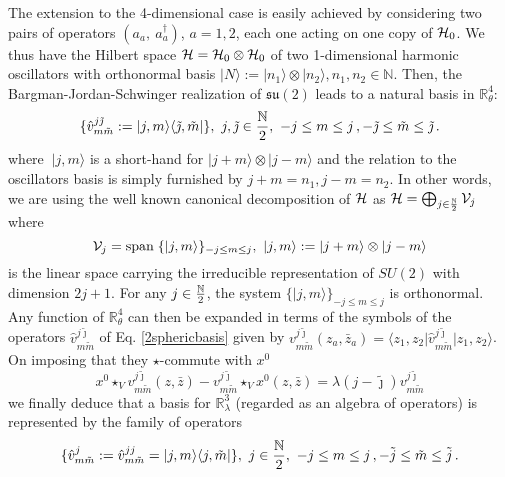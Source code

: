 \documentclass[a4paper,11pt]{article}
\numberwithin{equation}{section}
\newcommand\Rl{\mathbb{R}^3_\lambda}
\theoremstyle{nonumberplain}
\begin{document}
The extension to the 4-dimensional case is easily achieved by considering two pairs of operators $(a_a,\ a^\dag_a)$, $a=1,2$, each one acting on one copy of ${\cal{H}}_0$.  We thus have the Hilbert space  ${\cal{H}}={\cal{H}}_0\otimes {\cal{H}}_0$ of  two 1-dimensional harmonic oscillators with orthonormal basis $|N\rangle:= |n_1\rangle \otimes |n_2\rangle , n_1, n_2\in\mathbb{N}$.  Then, the Bargman-Jordan-Schwinger realization of $\mathfrak{su}(2)$ leads to a natural basis in  $\mathbb{R}^4_\theta$:
\begin{equation}
\{\hat v^{j\tilde\jmath}_{m\tilde m}:=|j,m\rangle\langle \tilde\jmath,\tilde m|\},\ j,\tilde\jmath\in{{\mathbb{N}}\over{2}},\ -j\le m\le j\, , -\tilde\jmath\le \tilde m\le \tilde\jmath \label{2sphericbasis}\, .
\end{equation}
where $\ |j,m\rangle$ is a short-hand for $|j+m\rangle\otimes| j-m\rangle$  and the relation to the oscillators basis is simply furnished by $j+m=n_1, j-m=n_2$.  In other words, we are using the well known canonical  decomposition of ${\cal{H}}$ as   ${\cal{H}} = \bigoplus_{ j\in{{\mathbb{N} }\over{2}}  }{\cal{V}}_j$ where
\begin{equation}
{\cal{V}}_j={\rm span}\;\{ |j,m\rangle\}_{-j\le m\le j},\ |j,m\rangle:=|j+m\rangle\otimes| j-m\rangle\label{irrepssu2}
\end{equation}
is the linear space carrying the irreducible representation of $SU(2)$ with dimension $2j+1$. For any $j\in{{\mathbb{N} }\over{2}} $, the 
system $\{ |j,m\rangle\}_{-j\le m\le j}$ is orthonormal. Any function of $\mathbb{R}^4_\theta$ can then be expanded in terms of the symbols of the operators $\hat v^{j\tilde\jmath}_{m\tilde m}$ of Eq.  \eqref{2sphericbasis} given by $ v^{j\tilde\jmath}_{m\tilde m}(z_a,\bar z_a)=\langle z_1,z_2\vert\hat v^{j\tilde\jmath}_{m\tilde m}\vert z_1,z_2 \rangle$. 
On imposing that they $\star$-commute with $x^0$
\begin{equation}
x^0 \star_V v^{j\tilde\jmath}_{m\tilde m} (z,\bar z)-v^{j\tilde\jmath}_{m\tilde m}\star_V
x^0 (z,\bar z)=\lambda(j-\tilde\jmath) v^{j\tilde\jmath}_{m\tilde m}
\end{equation}
we finally deduce that a basis for $\Rl$ (regarded as an algebra of operators)  is represented   by the family of operators
\begin{equation}
\{\hat v^{j}_{m\tilde m}:=\hat v^{jj}_{m\tilde m}=|j,m\rangle\langle j,\tilde m|\},\ j\in{{\mathbb{N}}\over{2}},\ -j\le m\le j\, , -\tilde j\le \tilde m\le \tilde j \label{basisr3l1}\,.
\end{equation}
\end{document}

